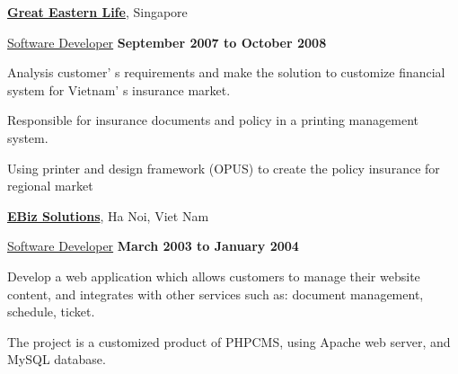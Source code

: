 \documentclass[10pt]{article}
\renewcommand\textit[1]{\underline{#1}}
\renewcommand{\section}[1]{\pagebreak[3]%
    \vspace{1.3\baselineskip}%
    \phantomsection\addcontentsline{toc}{section}{#1}%
    \noindent\llap{\scshape\smash{\parbox[t]{\marginparwidth}{\hyphenpenalty=10000\raggedright #1}}}%
    \vspace{-\baselineskip}\par}
\newcommand{\halfblankline}{\quad\vspace{-0.5\baselineskip}\pagebreak[3]}
\begin{document}
\href{http://clear2pay.com/}{\textbf{Great Eastern Life}}, Singapore
\begin{outerlist}

\item[] \textit{Software Developer}%
        \hfill \textbf{September 2007 to October 2008}

	\begin{innerlist}

		\item  Analysis  customer' s  requirements  and make  the  solution  to  customize  financial  system for  Vietnam' s  insurance market.
		\item  Responsible  for  insurance  documents  and  policy  in  a  printing management  system.
		\item  Using  printer and  design  framework  (OPUS)  to  create  the  policy  insurance  for  regional market
	
	\end{innerlist}

\end{outerlist}

\halfblankline

\href{http://ebizvietnam.net/}{\textbf{EBiz Solutions}}, Ha Noi, Viet Nam
\begin{outerlist}

\item[] \textit{Software Developer}%
        \hfill \textbf{March 2003 to January 2004}
	
	\begin{innerlist}
		\item  Develop  a  web  application  which  allows  customers  to manage  their  website  content, and  integrates  with  other  services  such  as:   document management,   schedule,   ticket.
		\item The  project  is  a  customized  product  of  PHPCMS,   using  Apache  web  server,   and MySQL database.
	\end{innerlist}

\end{outerlist}

\halfblankline


%
\end{document}
